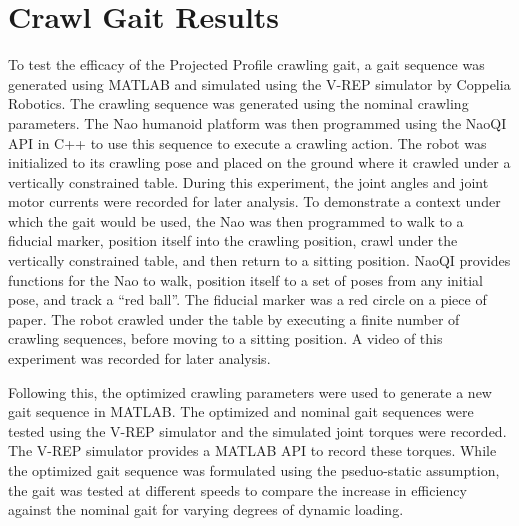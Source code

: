 \chapter{Crawl Gait Results} \label{ch:results_crawl_gait}


To test the efficacy of the Projected Profile crawling gait, a gait sequence was generated
using MATLAB and simulated using the V-REP simulator by Coppelia Robotics.
The crawling sequence was generated using the nominal crawling parameters. 
The Nao humanoid platform was then programmed using the NaoQI API in C++ to use this sequence 
to execute a crawling action. The robot was initialized to its crawling pose and placed on the 
ground where it crawled under a vertically constrained table. During this experiment, the joint angles and joint motor 
currents were recorded for later analysis.
To demonstrate a context under which the gait 
would be used, the Nao was then programmed to walk to a fiducial marker, position itself into
the crawling position, crawl under the vertically constrained table, and then return to a sitting position.
NaoQI provides functions for the Nao to walk, position itself to a set of poses from any initial
pose, and track a ``red ball''. The fiducial marker was a red circle on a piece of paper.
The robot crawled under the table by executing a finite number of crawling sequences, before
moving to a sitting position. A video of this experiment was recorded for later analysis.

Following this, the optimized crawling parameters were used to generate a new gait sequence in
MATLAB. The optimized and nominal gait sequences were tested using the V-REP simulator and the simulated
joint torques were recorded. The V-REP simulator provides a MATLAB API to record these torques.
While the optimized gait sequence was formulated using the pseduo-static assumption,
the gait was tested at different speeds to compare the increase in efficiency against the nominal
gait for varying degrees of dynamic loading.

